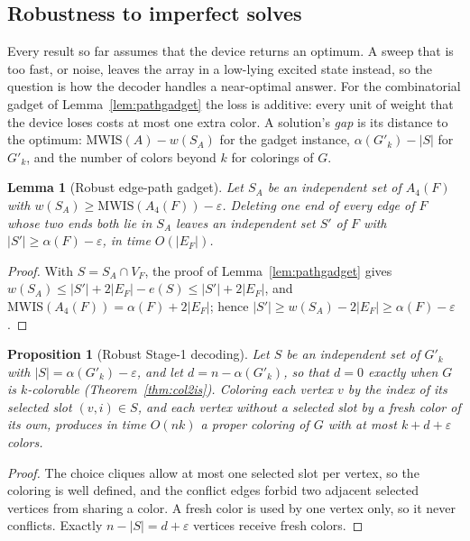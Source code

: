 \documentclass[a4paper,fleqn]{cas-sc}
\newtheorem{proposition}[theorem]{Proposition}
\newtheorem{lemma}[theorem]{Lemma}
\newcommand{\MWIS}{\mathrm{MWIS}}
\newcommand{\indep}{\alpha}
\begin{document}
\subsection{Robustness to imperfect solves}
\label{sec:robust}

Every result so far assumes that the device returns an optimum. A sweep that is too
fast, or noise, leaves the array in a low-lying excited state instead, so the question
is how the decoder handles a near-optimal answer. For the combinatorial gadget of
Lemma~\ref{lem:pathgadget} the loss is additive: every unit of weight that the device
loses costs at most one extra color. A solution's
\emph{gap} is its distance to the optimum: $\MWIS(A)-w(S_A)$ for the gadget instance,
$\indep(G'_k)-|S|$ for $G'_k$, and the number of colors beyond $k$ for colorings of
$G$.

\begin{lemma}[Robust edge-path gadget]
\label{lem:robustgadget}
Let $S_A$ be an independent set of $A_4(F)$ with
$w(S_A)\ge\MWIS(A_4(F))-\varepsilon$. Deleting one end of every edge of $F$
whose two ends both lie in $S_A$ leaves an independent set $S'$ of $F$ with
$|S'|\ge\indep(F)-\varepsilon$, in time $O(|E_F|)$.
\end{lemma}

\begin{proof}
With $S=S_A\cap V_F$, the proof of Lemma~\ref{lem:pathgadget} gives
$w(S_A)\le|S'|+2|E_F|-e(S)\le|S'|+2|E_F|$, and
$\MWIS(A_4(F))=\indep(F)+2|E_F|$; hence $|S'|\ge w(S_A)-2|E_F|\ge
\indep(F)-\varepsilon$.
\end{proof}

\begin{proposition}[Robust Stage-1 decoding]
\label{prop:robuststage1}
Let $S$ be an independent set of $G'_k$ with $|S|=\indep(G'_k)-\varepsilon$, and
let $d=n-\indep(G'_k)$, so that $d=0$ exactly when $G$ is $k$-colorable
(Theorem~\ref{thm:col2is}). Coloring each vertex $v$ by the index of its selected
slot $(v,i)\in S$, and each vertex without a selected slot by a fresh color of its
own, produces in time $O(nk)$ a proper coloring of $G$ with at most $k+d+\varepsilon$
colors.
\end{proposition}

\begin{proof}
The choice cliques allow at most one selected slot per vertex, so the coloring is
well defined, and the conflict edges forbid two adjacent selected vertices from
sharing a color. A fresh color is used by one vertex only, so it never conflicts.
Exactly $n-|S|=d+\varepsilon$ vertices receive fresh colors.
\end{proof}
\end{document}
